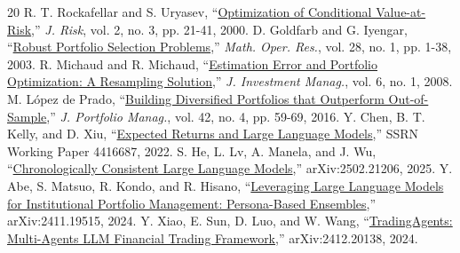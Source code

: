 \documentclass[conference]{IEEEtran}
\begin{document}
\begin{thebibliography}{20}
 R. T. Rockafellar and S. Uryasev, ``\href{https://www.risk.net/journal-risk/2161159/optimization-conditional-value-risk}{Optimization of Conditional Value-at-Risk},'' \textit{J. Risk}, vol. 2, no. 3, pp. 21-41, 2000.
 D. Goldfarb and G. Iyengar, ``\href{https://zhaosong-lu.github.io/ResearchPapers/robport-OMS.pdf}{Robust Portfolio Selection Problems},'' \textit{Math. Oper. Res.}, vol. 28, no. 1, pp. 1-38, 2003.
 R. Michaud and R. Michaud, ``\href{https://joim.com/articles-estimation-error-portfolio-optimization-resampling-solution}{Estimation Error and Portfolio Optimization: A Resampling Solution},'' \textit{J. Investment Manag.}, vol. 6, no. 1, 2008.
 M. L\'opez de Prado, ``\href{https://papers.ssrn.com/abstract=2708678}{Building Diversified Portfolios that Outperform Out-of-Sample},'' \textit{J. Portfolio Manag.}, vol. 42, no. 4, pp. 59-69, 2016.
 Y. Chen, B. T. Kelly, and D. Xiu, ``\href{https://papers.ssrn.com/sol3/papers.cfm?abstract_id=4416687}{Expected Returns and Large Language Models},'' SSRN Working Paper 4416687, 2022.
 S. He, L. Lv, A. Manela, and J. Wu, ``\href{https://arxiv.org/abs/2502.21206}{Chronologically Consistent Large Language Models},'' arXiv:2502.21206, 2025.
 Y. Abe, S. Matsuo, R. Kondo, and R. Hisano, ``\href{https://arxiv.org/abs/2411.19515}{Leveraging Large Language Models for Institutional Portfolio Management: Persona-Based Ensembles},'' arXiv:2411.19515, 2024.
 Y. Xiao, E. Sun, D. Luo, and W. Wang, ``\href{https://arxiv.org/abs/2412.20138}{TradingAgents: Multi-Agents LLM Financial Trading Framework},'' arXiv:2412.20138, 2024.
\end{thebibliography}
\end{document}

